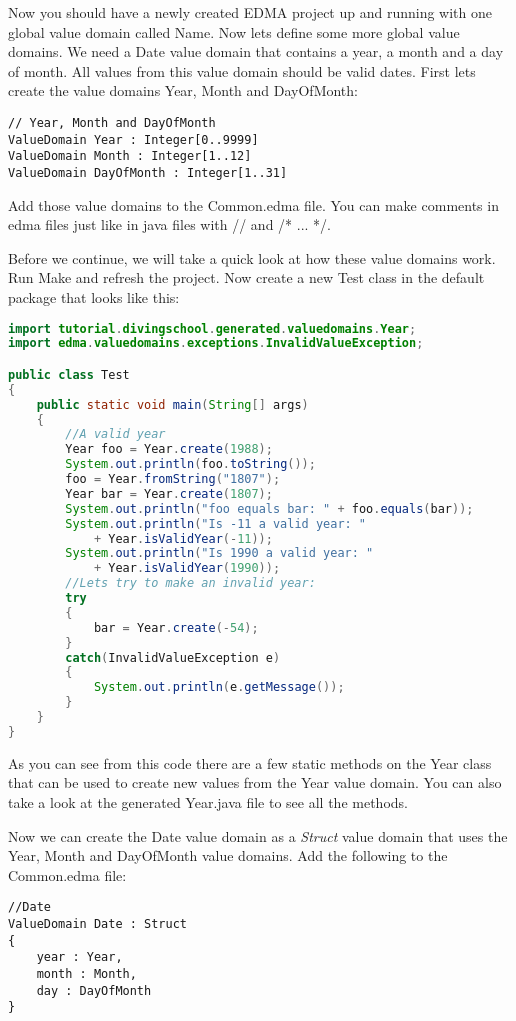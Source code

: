 Now you should have a newly created EDMA project up and running with
one global value domain called Name. Now lets define some more global
value domains. We need a Date value domain that contains a year, a
month and a day of month. All values from this value domain should
be valid dates. First lets create the value domains Year, Month and
DayOfMonth:
\begin{lstlisting}[basicstyle={\scriptsize}]
// Year, Month and DayOfMonth
ValueDomain Year : Integer[0..9999]
ValueDomain Month : Integer[1..12]
ValueDomain DayOfMonth : Integer[1..31]
\end{lstlisting}


Add those value domains to the Common.edma file. You can make comments
in edma files just like in java files with // and /{*} ... {*}/.

Before we continue, we will take a quick look at how these value domains
work. Run Make and refresh the project. Now create a new Test class
in the default package that looks like this:

\begin{lstlisting}[basicstyle={\scriptsize},breaklines=true,language=Java,tabsize=2]
import tutorial.divingschool.generated.valuedomains.Year;
import edma.valuedomains.exceptions.InvalidValueException;

public class Test
{
	public static void main(String[] args)
	{
		//A valid year
		Year foo = Year.create(1988);
		System.out.println(foo.toString());
		foo = Year.fromString("1807");
		Year bar = Year.create(1807);
		System.out.println("foo equals bar: " + foo.equals(bar));
		System.out.println("Is -11 a valid year: "
			+ Year.isValidYear(-11));
		System.out.println("Is 1990 a valid year: "
			+ Year.isValidYear(1990));
		//Lets try to make an invalid year:
		try
		{
			bar = Year.create(-54);
		}
		catch(InvalidValueException e)
		{
			System.out.println(e.getMessage());
		}
	}
}
\end{lstlisting}


As you can see from this code there are a few static methods on the
Year class that can be used to create new values from the Year value
domain. You can also take a look at the generated Year.java file to
see all the methods. 

Now we can create the Date value domain as a \emph{Struct} value domain
that uses the Year, Month and DayOfMonth value domains. Add the following
to the Common.edma file:
\begin{lstlisting}[basicstyle={\scriptsize}]
//Date
ValueDomain Date : Struct
{
	year : Year,
	month : Month,
	day : DayOfMonth
}
\end{lstlisting}


